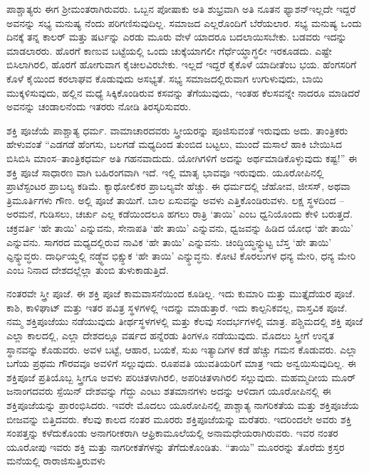 ಪಾಶ್ಚಾತ್ಯರು ಈಗ ಶ‍್ರೀಮಂತರಾಗಿರುವರು. ಒಬ್ಬನ ಪೋಷಾಕು ಅತಿ ಶುಭ್ರವಾಗಿ ಅತಿ ನೂತನ ಫ್ಯಾಶನ್​ ಇಲ್ಲದೇ ಇದ್ದರೆ ಅವನನ್ನು ಸಭ್ಯ ಮನುಷ್ಯ ನೆಂದು ಪರಿಗಣಿಸುವುದಿಲ್ಲ. ಸಮಾಜದ ಎಲ್ಲರೊಂದಿಗೆ ಬೆರೆಯಲಾರ. ಸಭ್ಯ ಮನುಷ್ಯ ಒಂದು ದಿನಕ್ಕೆ ತನ್ನ ಕಾಲರ್​ ಮತ್ತು ಷರ್ಟನ್ನು ಎರಡು ಮೂರು ವೇಳೆ ಯಾದರೂ ಬದಲಾಯಿಸಬೇಕು. ಬಡವರು ಇದನ್ನು ಮಾಡಲಾರರು. ಹೊರಗೆ ಕಾಣುವ ಬಟ್ಟೆಯಲ್ಲಿ ಒಂದು ಚುಕ್ಕೆಯಾಗಲೀ ಗೆರ್ಧೆಯ್ಧಾಗ್ಧಲೀ ಇರಕೂಡದು. ಎಷ್ಟೇ ಬಿಸಿಲಾಗಿರಲಿ, ಹೊರಗೆ ಹೋಗುವಾಗ ಕೈಚೀಲವಿರಬೇಕು. ಇಲ್ಲದೆ ಇದ್ದರೆ ಕೈಕೊಳೆ ಯಾದೀತೆಂಬ ಭಯ. ಹೆಂಗಸರಿಗೆ ಕೊಳೆ ಕೈಯಿಂದ ಕರಲಾಘವ ಕೊಡುವುದು ಅಸಭ್ಯತೆ. ಸಭ್ಯ ಸಮಾಜದಲ್ಲಿರುವಾಗ ಉಗುಳುವುದು, ಬಾಯಿ ಮುಕ್ಕಳಿಸುವುದು, ಹಲ್ಲಿನ ಮಧ್ಯೆ ಸಿಕ್ಕಿಕೊಂಡಿರುವ ಕಸವನ್ನು ತೆಗೆಯುವುದು, ಇಂತಹ ಕೆಲಸವನ್ನೇ ನಾದರೂ ಮಾಡಿದರೆ ಅವನನ್ನು ಚಂಡಾಲನೆಂದು ಇತರರು ನೋಡಿ ತಿರಸ್ಕರಿಸುವರು.

ಶಕ್ತಿ ಪೂಜೆಯೆ ಪಾಶ್ಚಾತ್ಯ ಧರ್ಮ. ವಾಮಾಚಾರದವರು ಸ್ತ್ರೀಯರನ್ನು ಪೂಜಿಸುವಂತೆ ಇರುವುದು ಅದು. ತಾಂತ್ರಿಕರು ಹೇಳುವಂತೆ “ಎಡಗಡೆ ಹೆಂಗಸು, ಬಲಗಡೆ ಮಧ್ಯದಿಂದ ತುಂಬಿದ ಬಟ್ಟಲು, ಮುಂದೆ ಮಸಾಲೆ ಹಾಕಿ ಬೇಯಿಸಿದ ಬಿಸಿಬಿಸಿ ಮಾಂಸ–ತಾಂತ್ರಿಕಧರ್ಮ ಅತಿ ಗಹನವಾದುದು. ಯೋಗಿಗಳಿಗೆ ಅದನ್ನು ಅರ್ಥಮಾಡಿಕೊಳ್ಳುವುದು ಕಷ್ಟ!” ಈ ಶಕ್ತಿ ಪೂಜೆ ಸಾಧಾರಣ ವಾಗಿ ಬಹಿರಂಗವಾಗಿ ಇದೆ. ಇಲ್ಲಿ ಮಾತೃ ಭಾವವೂ ಇರುವುದು. ಯೂರೋಪಿನಲ್ಲಿ ಪ್ರಾಟೆಸ್ಟಂಟರ ಪ್ರಾಬಲ್ಯ ಕಡಿಮೆ. ಕ್ಯಾಥೋಲಿಕರ ಪ್ರಾಬಲ್ಯವೇ ಹೆಚ್ಚು. ಈ ಧರ್ಮದಲ್ಲಿ ಜೆಹೋವ, ಜೀಸಸ್​, ಅಥವಾ ತ್ರಿಮೂರ್ತಿಗಳು ಗೌಣ. ಅಲ್ಲಿ ಪೂಜೆ ತಾಯಿಗೆ. ಬಾಲ ಏಸುವನ್ನು ಅವಳು ಎತ್ತಿಕೊಂಡಿರುವಳು. ಲಕ್ಷ ಸ್ಥಳದಿಂದ – ಅರಮನೆ, ಗುಡಿಸಲು, ಚರ್ಚು ಎಲ್ಲ ಕಡೆಯಿಂದಲೂ ಹಗಲು ರಾತ್ರಿ ‘ತಾಯಿ’ ಎಂಬ ಧ್ವನಿಯೊಂದು ಕೇಳಿ ಬರುತ್ತದೆ. ಚಕ್ರವರ್ತಿ ‘ಹೇ ತಾಯಿ’ ಎನ್ನುವನು, ಸೇನಾಪತಿ ‘ಹೇ ತಾಯಿ’ ಎನ್ನುವನು, ಧ್ವಜವನ್ನು ಹಿಡಿದ ಯೋಧ ‘ಹೇ ತಾಯಿ’ ಎನ್ನುವನು. ಸಾಗರದ ಮಧ್ಯದಲ್ಲಿರುವ ನಾವಿಕ ‘ಹೇ ತಾಯಿ’ ಎನ್ನುವನು. ಚಿಂದ್ಧಿಯ್ಧನ್ನ್ಧುಟ್ಟ ಬೆಸ್ತ ‘ಹೇ ತಾಯಿ’ ಎ್ಧನ್ನ್ಧುವ್ಧರು. ದಾರ್ಧಿಯ್ಧಲ್ಲಿ ನಡ್ಧ್ಧೆವ ಭಿಕ್ಷ್ಧುಕ ‘ಹೇ ತಾಯಿ’ ಎನ್ನ್ಧುವ್ಧನು. ಕೋಟಿ ಕೊರಲುಗಳ ಧನ್ಯ ಮೇರಿ, ಧನ್ಯ ಮೇರಿ ಎಂಬ ನಿನಾದ ದೇಶದಲ್ಲೆಲ್ಲಾ ತುಂಬಿ ತುಳುಕಾಡುತ್ತಿದೆ.

ನಂತರವೇ ಸ್ತ್ರೀ ಪೂಜೆ. ಈ ಶಕ್ತಿ ಪೂಜೆ ಕಾಮವಾಸನೆಯಿಂದ ಕೂಡಿಲ್ಲ. ಇದು ಕುಮಾರಿ ಮತ್ತು ಮುತ್ತೈದೆಯರ ಪೂಜೆ. ಕಾಶಿ, ಕಾಳಿಘಾಟ್​ ಮತ್ತು ಇತರ ಪವಿತ್ರ ಸ್ಥಳಗಳಲ್ಲಿ ಇದನ್ನು ಮಾಡುತ್ತಾರೆ. ಇದು ಕಾಲ್ಪನಿಕವಲ್ಲ, ವಾಸ್ತವಿಕ ಪೂಜೆ. ನಮ್ಮ ಶಕ್ತಿಪೂಜೆಯು ನಡೆಯುವುದು ತೀರ್ಥಸ್ಥಳಗಳಲ್ಲಿ ಮತ್ತು ಕೆಲವು ಸಂದರ್ಭಗಳಲ್ಲಿ ಮಾತ್ರ. ಪಶ್ಚಿಮದಲ್ಲಿ ಶಕ್ತಿ ಪೂಜೆ ಎಲ್ಲಾ ಕಾಲದಲ್ಲಿ, ಎಲ್ಲಾ ದೇಶದಲ್ಲೂ ವರ್ಷದ ಹನ್ನೆರಡು ತಿಂಗಳೂ ನಡೆಯುವುದು. ಮೊದಲು ಸ್ತ್ರೀಗೆ ಉನ್ನತ ಸ್ಥಾನವನ್ನು ಕೊಡುವರು. ಅವಳ ಬಟ್ಟೆ, ಆಹಾರ, ಬಯಕೆ, ಸುಖ ಇತ್ಯಾದಿಗಳ ಕಡೆ ಹೆಚ್ಚು ಗಮನ ಕೊಡುವರು. ಎಲ್ಲಾ ಬಗೆಯ ಪ್ರಥಮ ಗೌರವವೂ ಅವಳಿಗೆ ಸಲ್ಲುವುದು. ರೂಪವತಿ ಯುವತಿಯರಿಗೆ ಮಾತ್ರ ಇದು ಅನ್ವಯಿಸುವುದಿಲ್ಲ. ಈ ಶಕ್ತಿಪೂಜೆ ಪ್ರತಿಯೊಬ್ಬ ಸ್ತ್ರೀಗೂ ಅವಳು ಪರಿಚಿತಳಾಗಿರಲಿ, ಅಪರಿಚಿತಳಾಗಿರಲಿ ಸಲ್ಲುವುದು. ಮಹಮ್ಮದೀಯ ಮೂರ್​ ಜನಾಂಗದವರು ಸ್ಪೆಯಿನ್​ ದೇಶವನ್ನು ಗೆದ್ದು ಎಂಟು ಶತಮಾನಗಳು ಅದನ್ನು ಆಳಿದಾಗ ಯೂರೋಪಿನಲ್ಲಿ ಈ ಶಕ್ತಿಪೂಜೆಯನ್ನು ಪ್ರಾರಂಭಿಸಿದರು. ಇವರೇ ಮೊದಲು ಯೂರೋಪಿನಲ್ಲಿ ಪಾಶ್ಚಾತ್ಯ ನಾಗರಿಕತೆಯ ಮತ್ತು ಶಕ್ತಿಪೂಜೆಯ ಬೀಜವನ್ನು ಬಿತ್ತಿದವರು. ಕೆಲವು ಕಾಲದ ನಂತರ ಮೂರರು ಶಕ್ತಿಪೂಜೆಯನ್ನು ಮರೆತರು. ಇದರಿಂದಲೇ ಅವರು ಶಕ್ತಿ ಸಂಪತ್ತನ್ನು ಕಳೆದುಕೊಂಡು ಅನಾಗರೀಕರಾಗಿ ಆಫ್ರಿಕಾಮೂಲೆಯಲ್ಲಿ ಅನಾಮಧೇಯರಾಗಿರುವರು. ಇವರ ನಂತರ ಯೂರೋಪು ಇವರು ಶಕ್ತಿ ಮತ್ತು ನಾಗರೀಕತೆಗಳನ್ನು ತೆಗೆದುಕೊಂಡಿತು. “ತಾಯಿ” ಮೂರರನ್ನು ತೊರೆದು ಕ್ರಸ್ತರ ಮನೆಯಲ್ಲಿ ರಾರಾಜಿಸುತ್ತಿರುವಳು


